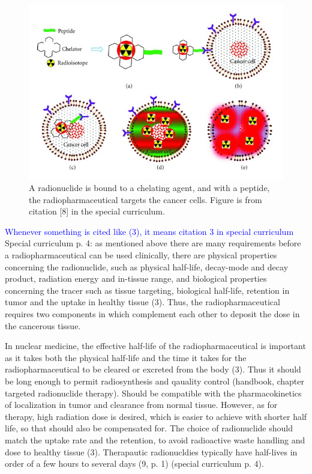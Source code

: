 \documentclass[a4paper,11pt,twoside]{book}
\begin{document}
\begin{figure}
    \centering
    \includegraphics[width=12cm\textwidth]{Theory/therapy-peptide.jpg}
    \caption{A radionuclide is bound to a chelating agent, and with a peptide, the radiopharmaceutical targets the cancer cells. Figure is from citation [8] in the special curriculum. }
    \label{fig:therapy_chelator_peptide}
\end{figure}

\noindent    \textcolor{blue}{Whenever something is cited like (3), it means citation 3 in special curriculum}
Special curriculum p. 4: as mentioned above there are many requirements before a radiopharmaceutical can be used clinically, there are physical properties concerning the radionuclide, such as physical half-life, decay-mode and decay product, radiation energy and in-tissue range, and biological properties concerning the tracer such as tissue targeting, biological half-life, retention in tumor and the uptake in healthy tissue (3).  Thus, the radiopharmaceutical requires two components in which complement each other to deposit the dose in the cancerous tissue. 

In nuclear medicine, the effective half-life of the radiopharmaceutical is important as it takes both the physical half-life and the time it takes for the radiopharmaceutical to be cleared or excreted from the body (3). Thus it should be long enough to permit radiosynthesis and qauality control (handbook, chapter targeted radionuclide therapy). Should be compatible with the pharmacokinetics of localization in tumor and clearance from normal tissue. However, as for therapy, high radiation dose is desired, which is easier to achieve with shorter half life, so that should also be compensated for. The choice of radionuclide should match the uptake rate and the retention, to avoid radioactive waste handling and dose to healthy tissue (3). Therapautic radionucldies typically have half-lives  in order of a few hours to several days (9, p. 1) (special curriculum p. 4).\\
\end{document}
